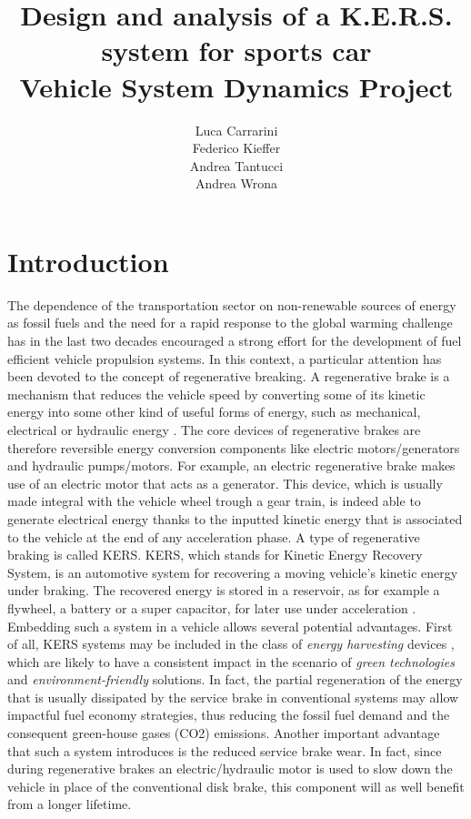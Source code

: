 \documentclass[11pt]{article}
\begin{document}
\title{\textcolor{sapred}{Design and analysis of a K.E.R.S. system for sports car}\\\small{Vehicle System Dynamics Project}}
\author{Luca Carrarini\\Federico Kieffer\\Andrea Tantucci\\Andrea Wrona}
\maketitle

\thispagestyle{empty}

\tableofcontents
\newpage

\section{Introduction}

The dependence of the transportation sector on non-renewable sources of energy as fossil fuels and the need for a rapid response to the global warming challenge has in the last two decades encouraged a strong effort for the development of fuel efficient vehicle propulsion systems. In this context, a particular attention has been devoted to the concept of regenerative breaking. A regenerative brake is a mechanism that reduces the vehicle speed by converting some of its kinetic energy into some other kind of useful forms of energy, such as mechanical, electrical or hydraulic energy \cite{a}. The core devices of regenerative brakes are therefore reversible energy conversion components like electric motors/generators and hydraulic pumps/motors. For example, an electric regenerative brake makes use of an electric motor that acts as a generator. This device, which is usually made integral with the vehicle wheel trough a gear train, is indeed able to generate electrical energy thanks to the inputted kinetic energy that is associated to the vehicle at the end of any acceleration phase. 
A type of regenerative braking is called KERS. KERS, which stands for Kinetic Energy Recovery System, is an automotive system for recovering a moving vehicle's kinetic energy under braking. The recovered energy is stored in a reservoir, as for example a flywheel, a battery or a super capacitor, for later use under acceleration \cite{b}. 
Embedding such a system in a vehicle allows several potential advantages. First of all, KERS systems may be included in the class of \textit{energy harvesting} devices \cite{c}, which are likely to have a consistent impact in the scenario of \textit{green technologies} and \textit{environment-friendly} solutions. In fact, the partial regeneration of the energy that is usually dissipated by the service brake in conventional systems may allow impactful fuel economy strategies, thus reducing the fossil fuel demand and the consequent green-house gases (CO2) emissions. Another important advantage that such a system introduces is the reduced service brake wear. In fact, since during regenerative brakes an electric/hydraulic motor is used to slow down the vehicle in place of the conventional disk brake, this component will as well benefit from a longer lifetime. 
\end{document}
